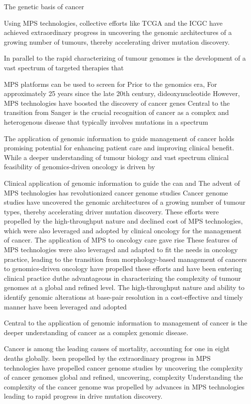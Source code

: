 The genetic basis of cancer

Using MPS technologies, collective efforts like TCGA and the ICGC have achieved extraordinary progress in uncovering the genomic architectures of a growing number of tumours, thereby accelerating driver mutation discovery.

In parallel to the rapid characterizing of tumour genomes is the development of a vast spectrum of targeted therapies that

MPS platforms can be used to screen for Prior to the genomics era, For approximately 25 years since the late 20th century, dideoxynucleotide However, MPS technologies have boosted the discovery of cancer genes Central to the transition from Sanger  is the crucial recognition of cancer as a complex and heterogenous disease that typically involves mutations in a spectrum

The application of genomic information to guide management of cancer holds promising potential for enhancing patient care and improving clinical benefit. While a deeper understanding of tumour biology and vast spectrum clinical feasibility of genomics-driven oncology is driven by

Clinical application of genomic information to guide the can and The advent of MPS technologies has revolutionized cancer genome studies
Cancer genome studies have uncovered the genomic architectures of a growing number of tumour types, thereby accelerating driver mutation discovery. These efforts were propelled by the high-throughput nature and declined cost of MPS technologies, which were also leveraged and adopted by clinical oncology for the management of cancer. The application of MPS to oncology care gave rise   These features of MPS technologies were also leveraged and adapted to fit the needs in oncology practice, leading to the transition from morphology-based management of cancers to genomics-driven oncology  have propelled these efforts and have been entering clinical practice duthe advantageous in characterizing the complexity of tumour genomes at a global and refined level. The high-throughput nature and ability to identify genomic alterations at base-pair resolution in a cost-effective and timely manner have been leveraged and adopted

Central to the application of genomic information to management of cancer is the deeper understanding of cancer as a complex genomic disease.

Cancer is among the leading causes of mortality, accounting for one in eight deaths globally.
been propelled by the extraordinary progress in MPS technologies have propelled cancer genome studies by uncovering the complexity of cancer genomes
global and refined, uncovering, complexity
Understanding the complexity of the cancer genome was propelled by advances in MPS technologies leading to rapid progress in drive mutation discovery.

